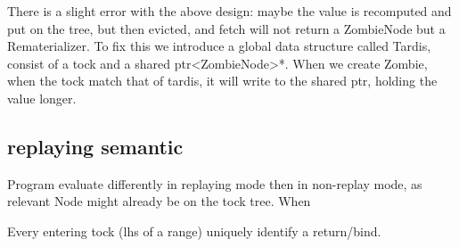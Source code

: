 There is a slight error with the above design: maybe the value is recomputed and put on the tree, but then evicted, and fetch will not return a ZombieNode but a Rematerializer. To fix this we introduce a global data structure called Tardis, consist of a tock and a shared ptr<ZombieNode>*. When we create Zombie, when the tock match that of tardis, it will write to the shared ptr, holding the value longer.

\subsection{replaying semantic}
Program evaluate differently in replaying mode then in non-replay mode, as relevant Node might already be on the tock tree. When 

Every entering tock (lhs of a range) uniquely identify a return/bind.


